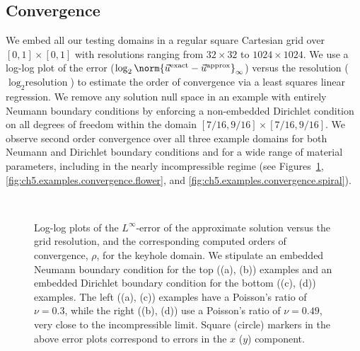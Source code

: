 \subsection{Convergence} \label{subsec:ch5.examples.convergence}

We embed all our testing domains in a regular square Cartesian grid over $[0,1] 
\times [0,1]$ with resolutions ranging from $32 \times 32$ to $1024 \times 1024$. We use a log-log plot of the error ($\log_2 \norm{\vec{u}^{\text{exact}} - \vec{u}^{\text{approx}}}_{\infty}$) versus the resolution ($\log_2 \text{resolution}$) to estimate the order of convergence via a least squares linear regression. We remove any solution null space in an example with entirely Neumann boundary conditions by enforcing a non-embedded Dirichlet condition on all degrees of freedom within the domain $[7/16,9/16] \times [7/16,9/16]$. We observe second order convergence over all three example domains for both Neumann and Dirichlet boundary conditions and for a wide range of material parameters, including in the nearly incompressible regime (see Figures~\ref{fig:ch5.examples.convergence.ginkgo}, \ref{fig:ch5.examples.convergence.flower}, and \ref{fig:ch5.examples.convergence.spiral}).

\setlength{\figurewidth}{0.45\columnwidth}
\begin{figure}[htbp]
\begin{center}
 \\
\caption{Log-log plots of the $L^{\infty}$-error of the approximate solution versus the grid resolution, and the corresponding computed orders of convergence, $\rho$, for the keyhole domain. We stipulate an embedded Neumann boundary condition for the top ((a), (b)) examples and an embedded Dirichlet boundary condition for the bottom ((c), (d)) examples. The left ((a), (c)) examples have a Poisson's ratio of $\nu = 0.3$, while the right ((b), (d)) use a Poisson's ratio of $\nu = 0.49$, very close to the incompressible limit. Square (circle) markers in the above error plots correspond to errors in the $x$ ($y$) component.}
\label{fig:ch5.examples.convergence.ginkgo}
\end{center}
\end{figure}


